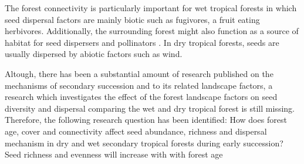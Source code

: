 The forest connectivity is particularly important for wet tropical forests in which seed dispersal factors are mainly biotic such as fugivores, a fruit eating herbivores. Additionally, the surrounding forest might also function as a source of habitat for seed dispersers and pollinators \citep{hordijk2023efectos, arroyo-rodriguezMultipleSuccessionalPathways2017}. In dry tropical forests, seeds are usually dispersed by abiotic factors such as wind. 


Altough, there has been a substantial amount of research published on the mechanisms of secondary succession and to its related landscape factors, a research which investigates the effect of the forest landscape factors on seed diversity and dispersal comparing the wet and dry tropical forest is still missing. 
Therefore, the following research question has been identified: How does forest age, cover and connectivity affect seed abundance, richness and dispersal mechanism in dry and wet secondary tropical forests during early succession? 
Seed richness and evenness will increase with with forest age \citep{chazdonSecondGrowthPromise2014}
